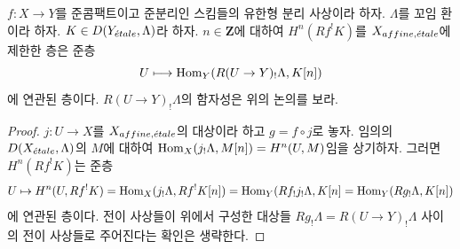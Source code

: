 \begin{lemma}
\label{lemma-describe-Rf-upper-shriek}
$f : X \to Y$를 준콤팩트이고 준분리인 스킴들의 유한형 분리 사상이라
하자. $\Lambda$를 꼬임 환이라 하자.
$K \in D(Y_{\acute{e}tale}, \Lambda)$라 하자. $n \in \mathbf{Z}$에 대하여
$H^n(Rf^!K)$를 $X_{affine, {\acute{e}tale}}$에 제한한 층은 준층
$$
U \longmapsto \mathop{\mathrm{Hom}}\nolimits_Y(R(U \to Y)_!\Lambda, K[n])
$$
에 연관된 층이다. $R(U \to Y)_!\Lambda$의 함자성은 위의 논의를 보라.
\end{lemma}

\begin{proof}
$j : U \to X$를 $X_{affine, {\acute{e}tale}}$의 대상이라 하고
$g = f \circ j$로 놓자. 임의의
$D(X_{\acute{e}tale}, \Lambda)$의 $M$에 대하여
$\mathop{\mathrm{Hom}}\nolimits_X(j_!\Lambda, M[n]) = H^n(U, M)$임을 상기하자.
그러면 $H^n(Rf^!K)$는 준층
$$
U \mapsto H^n(U, Rf^!K) = \mathop{\mathrm{Hom}}\nolimits_X(j_!\Lambda, Rf^!K[n]) =
\mathop{\mathrm{Hom}}\nolimits_Y(Rf_!j_!\Lambda, K[n] = \mathop{\mathrm{Hom}}\nolimits_Y(Rg_!\Lambda, K[n])
$$
에 연관된 층이다.
전이 사상들이 위에서 구성한 대상들
$Rg_!\Lambda = R(U \to Y)_!\Lambda$ 사이의 전이 사상들로 주어진다는
확인은 생략한다.
\end{proof}







